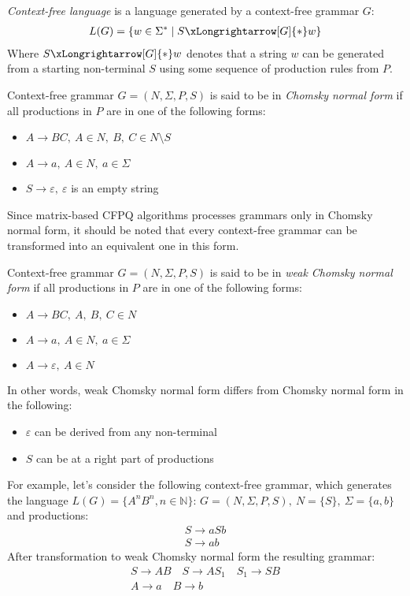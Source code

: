 \begin{definition} \emph{Context-free language} is a language generated by a context-free grammar $G$:
\begin{align*}
     L(G) = \{w \in \Sigma^* \mid S \xLongrightarrow[G]{*} w \} 
\end{align*}
Where $S \xLongrightarrow[G]{*} w$  denotes that a string $w$ can be generated from a starting non-terminal $S$ using some sequence of production rules from $P$.
\end{definition}
\begin{definition} Context-free grammar $G = (N, \Sigma, P, S)$ is said to be in \emph{Chomsky normal form} if all productions in $P$ are in one of the following forms:
    \begin{itemize}
        \item $A \rightarrow BC,~A \in N,~B,~C \in N \setminus S$
        \item  $A \rightarrow a,~A \in N,~a \in \Sigma$
        \item $S \rightarrow \varepsilon,~\varepsilon$ is an empty string
    \end{itemize}
\end{definition}
 Since matrix-based CFPQ algorithms processes grammars only in Chomsky normal form, it should be noted that every context-free grammar can be transformed into an equivalent one in this form. 
\begin{definition} Context-free grammar $G = (N, \Sigma, P, S)$ is said to be in \emph{weak Chomsky normal form} if all productions in $P$ are in one of the following forms:
    \begin{itemize}
        \item $A \rightarrow BC,~A,~B,~C \in N$
        \item  $A \rightarrow a,~A \in N,~a \in \Sigma$
        \item $A \rightarrow \varepsilon,~A \in N$
    \end{itemize}
\end{definition}
In other words, weak Chomsky normal form differs from Chomsky normal form in the following:
\begin{itemize}
    \item $\varepsilon$ can be derived from any non-terminal
    \item $S$ can be at a right part of productions
\end{itemize}
    
    
For example, let's consider the following context-free grammar, which generates the language $L(G) = \{A^nB^n, n \in \mathbb{N}\}$:
$G=(N, \Sigma, P, S), ~N=\{S\},~\Sigma=\{a,b\}$ and productions: 
\begin{align*}
S \rightarrow aSb\\
S \rightarrow ab
\end{align*}
After transformation to weak Chomsky normal form the resulting grammar:
\begin{gather*}
S \rightarrow AB  \quad S \rightarrow AS_1 \quad S_1 \rightarrow SB \\
A \rightarrow a \quad B \rightarrow b \quad
\end{gather*}

